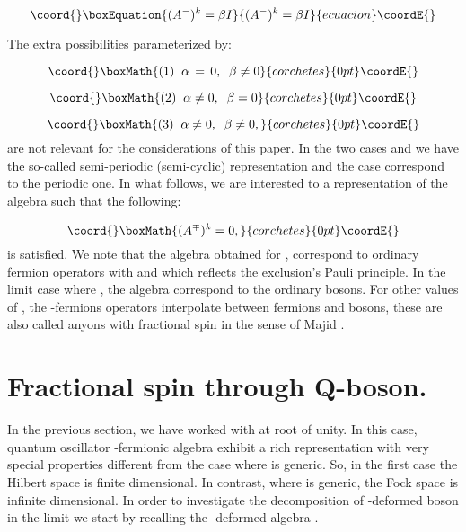 \documentclass[a4paper,12pt,thmsa]{article}
\begin{document}
\begin{equation}\coord{}\boxEquation{
(A^{-})^k=\beta I
}{
(A^{-})^k=\beta I
}{ecuacion}\coordE{}\end{equation}

The extra possibilities parameterized by:

\[\coord{}\boxMath{
(1) \;\; \alpha \, =\, 0, \;\; \beta \neq 0
}{corchetes}{0pt}\coordE{}\]

\[\coord{}\boxMath{
(2) \;\; \alpha \neq 0, \;\; \beta =0
}{corchetes}{0pt}\coordE{}\]

\[\coord{}\boxMath{
(3) \;\; \alpha \neq 0, \;\;\beta \neq 0,
}{corchetes}{0pt}\coordE{}\]
are not relevant for the considerations of this paper. In the two cases \coordHE{}
and \coordHE{} we have the so-called semi-periodic (semi-cyclic) representation
and the case \coordHE{} correspond to the periodic one. In what follows, we are
interested to a representation of the algebra \coordHE{} such that the
following:

\[\coord{}\boxMath{
(A^{\mp })^k=0,
}{corchetes}{0pt}\coordE{}\]
is satisfied. We note that the algebra \coordHE{} obtained for \coordHE{},
correspond to ordinary fermion operators with \coordHE{} and \coordHE{}
which reflects the exclusion's Pauli principle. In the limit case where \coordHE{}, the algebra \coordHE{} correspond to the ordinary
bosons. For other values of \coordHE{}, the \coordHE{}-fermions operators interpolate
between fermions and bosons, these are also called anyons with fractional
spin in the sense of Majid \myHighlight{$[21,22]$}\coordHE{}.

\section{Fractional spin through Q-boson.}

In the previous section, we have worked with \coordHE{} at root of unity. In this
case, quantum oscillator \coordHE{}-fermionic\myHighlight{$)$}\coordHE{} algebra exhibit a rich
representation with very special properties different from the case where \coordHE{}
is generic. So, in the first case the Hilbert space is finite dimensional.
In contrast, where \coordHE{} is generic, the Fock space is infinite dimensional.
In order to investigate the decomposition of \coordHE{}-deformed boson in the limit
\coordHE{} we start by recalling the \coordHE{}-deformed
algebra \coordHE{}.
\end{document}
